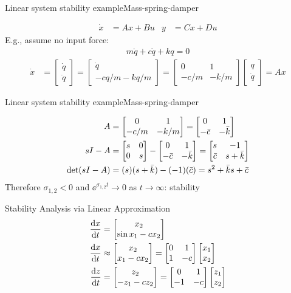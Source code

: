 \documentclass{beamer-control}
\begin{document}
\begin{frame}{Linear system stability example}{Mass-spring-damper}

\begin{align}
\dot x &= Ax + Bu & y &= Cx + Du
\end{align}
E.g., assume no input force:
\begin{align}
m\ddot q + c\dot q + kq = 0
\end{align}
\begin{align}
\dot x &= \begin{bmatrix}\dot q\\\ddot q\end{bmatrix} = \begin{bmatrix}\dot q\\- cq/m - kq/m\end{bmatrix} 
              = \begin{bmatrix}0 & 1\\- c/m & - k/m\end{bmatrix}\begin{bmatrix} q\\\dot q\end{bmatrix} = Ax
\end{align}

\end{frame}

\begin{frame}{Linear system stability example}{Mass-spring-damper}


\begin{align}
A &= \begin{bmatrix}0 & 1\\- c/m & - k/m\end{bmatrix} = \begin{bmatrix}0 & 1\\- \bar c & - \bar k\end{bmatrix} \\
sI-A &= \begin{bmatrix}s & 0\\0 & s\end{bmatrix} - \begin{bmatrix}0 & 1\\- \bar c & - \bar k\end{bmatrix} = \begin{bmatrix}s & -1\\ \bar c & s+ \bar k\end{bmatrix} \\
\det(sI-A) &= (s)(s+ \bar k) - (-1)(\bar c) = s^2 + \bar k s  + \bar c
\end{align}
Therefore $\sigma_{1,2}<0$ and $\ee^{\sigma_{1,2} t}\to 0$ as $t\to\infty$: stability

\end{frame}



\begin{frame}{Stability Analysis via Linear Approximation}
\begin{align}
\frac{\mathrm{d} x}{\mathrm{d} t} &= \begin{bmatrix}x_2\\\sin x_1-c x_2\end{bmatrix} \\
\frac{\mathrm{d} x}{\mathrm{d} t} &\approx \begin{bmatrix}x_2\\ x_1-c x_2\end{bmatrix} = \begin{bmatrix}0 & 1\\1 & -c\end{bmatrix}\begin{bmatrix}x_1\\x_2\end{bmatrix} \\
\frac{\mathrm{d} z}{\mathrm{d} t} &= \begin{bmatrix}z_2\\ -z_1-c z_2\end{bmatrix} = \begin{bmatrix}0 & 1\\-1 & -c\end{bmatrix}\begin{bmatrix}z_1\\z_2\end{bmatrix}
\end{align}
\end{frame}
\end{document}
